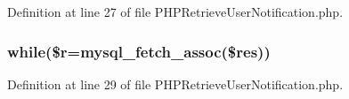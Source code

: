 Definition at line 27 of file P\-H\-P\-Retrieve\-User\-Notification.\-php.

\hypertarget{_p_h_p_retrieve_user_notification_8php_a13a796604f93a68cd06c9010c6a6d0e5}{
\subsubsection[{while}]{\setlength{\rightskip}{0pt plus 5cm}while(\$r=mysql\-\_\-fetch\-\_\-assoc(\$res))}}\label{_p_h_p_retrieve_user_notification_8php_a13a796604f93a68cd06c9010c6a6d0e5}


Definition at line 29 of file P\-H\-P\-Retrieve\-User\-Notification.\-php.

